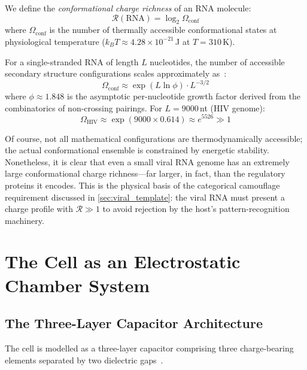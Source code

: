 \documentclass[12pt,a4paper]{article}
\theoremstyle{definition}
\theoremstyle{remark}
\newcommand{\Rcat}{\mathcal{R}}
\begin{document}
We define the \emph{conformational charge richness} of an RNA molecule:
\begin{equation}
  \Rcat(\mathrm{RNA}) = \log_2 \Omega_{\mathrm{conf}}
  \label{eq:RNA_richness}
\end{equation}
where $\Omega_{\mathrm{conf}}$ is the number of thermally accessible conformational states at physiological temperature ($k_BT \approx 4.28 \times 10^{-21}$\,J at $T = 310$\,K).

For a single-stranded RNA of length $L$ nucleotides, the number of accessible secondary structure configurations scales approximately as~\cite{Waterman1978,Zuker1989}:
\begin{equation}
  \Omega_{\mathrm{conf}} \approx \exp(L \ln \phi) \cdot L^{-3/2}
\end{equation}
where $\phi \approx 1.848$ is the asymptotic per-nucleotide growth factor derived from the combinatorics of non-crossing pairings. For $L = 9000$\,nt (HIV genome):
\begin{equation}
  \Omega_{\mathrm{HIV}} \approx \exp(9000 \times 0.614) \approx e^{5526} \gg 1
\end{equation}

Of course, not all mathematical configurations are thermodynamically accessible; the actual conformational ensemble is constrained by energetic stability. Nonetheless, it is clear that even a small viral RNA genome has an extremely large conformational charge richness---far larger, in fact, than the regulatory proteins it encodes. This is the physical basis of the categorical camouflage requirement discussed in \cref{sec:viral_template}: the viral RNA must present a charge profile with $\Rcat \gg 1$ to avoid rejection by the host's pattern-recognition machinery.

\section{The Cell as an Electrostatic Chamber System}
\label{sec:chambers}

\subsection{The Three-Layer Capacitor Architecture}

The cell is modelled as a three-layer capacitor comprising three charge-bearing elements separated by two dielectric gaps~\cite{McLaughlin1989,Bhaskara2010}.
\end{document}
